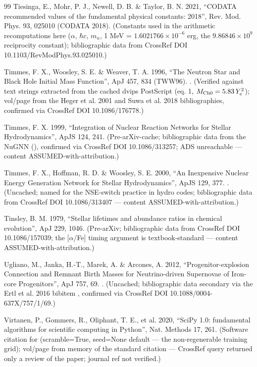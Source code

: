 \begin{thebibliography}{99}
Tiesinga, E., Mohr, P. J., Newell, D. B. \& Taylor, B. N. 2021, ``CODATA recommended values of the fundamental physical constants: 2018'', Rev. Mod. Phys. 93, 025010 (CODATA 2018). (Constants used in the arithmetic recomputations here ($\alpha$, $\hbar c$, $m_u$, 1 MeV = $1.6021766\times10^{-6}$ erg, the $9.86846\times10^{9}$ reciprocity constant); bibliographic data from CrossRef DOI 10.1103/RevModPhys.93.025010.)

Timmes, F. X., Woosley, S. E. \& Weaver, T. A. 1996, ``The Neutron Star and Black Hole Initial Mass Function'', ApJ 457, 834 (TWW96). . (Verified against text strings extracted from the cached dvips PostScript (eq. 1, $M_{\mathrm{Ch0}} = 5.83\,Y_{e}^2$); vol/page from the Heger et al. 2001 and Suwa et al. 2018 bibliographies, confirmed via CrossRef DOI 10.1086/176778.)

Timmes, F. X. 1999, ``Integration of Nuclear Reaction Networks for Stellar Hydrodynamics'', ApJS 124, 241. (Pre-arXiv-cache; bibliographic data from the NuGNN  (), confirmed via CrossRef DOI 10.1086/313257; ADS unreachable --- content ASSUMED-with-attribution.)

Timmes, F. X., Hoffman, R. D. \& Woosley, S. E. 2000, ``An Inexpensive Nuclear Energy Generation Network for Stellar Hydrodynamics'', ApJS 129, 377. . (Uncached; named for the NSE-switch practice in hydro codes; bibliographic data from CrossRef DOI 10.1086/313407 --- content ASSUMED-with-attribution.)

Tinsley, B. M. 1979, ``Stellar lifetimes and abundance ratios in chemical evolution'', ApJ 229, 1046. (Pre-arXiv; bibliographic data from CrossRef DOI 10.1086/157039; the [$\alpha$/Fe] timing argument is textbook-standard --- content ASSUMED-with-attribution.)

Ugliano, M., Janka, H.-T., Marek, A. \& Arcones, A. 2012, ``Progenitor-explosion Connection and Remnant Birth Masses for Neutrino-driven Supernovae of Iron-core Progenitors'', ApJ 757, 69. . (Uncached; bibliographic data secondary via the Ertl et al. 2016  bibitem , confirmed via CrossRef DOI 10.1088/0004-637X/757/1/69.)

Virtanen, P., Gommers, R., Oliphant, T. E., et al. 2020, ``SciPy 1.0: fundamental algorithms for scientific computing in Python'', Nat. Methods 17, 261. (Software citation for  (scramble=True, seed=None default --- the non-regenerable training grid); vol/page from memory of the standard citation --- CrossRef query returned only a review of the paper; journal ref not verified.)


\end{thebibliography}
